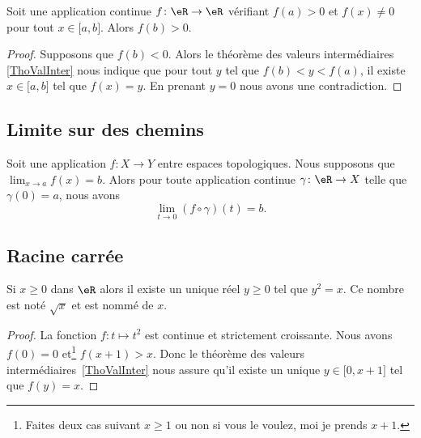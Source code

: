 \begin{corollary}	\label{CORooQXHDooWjSiKm}
	Soit une application continue \(f \colon \eR\to \eR  \) vérifiant \( f(a)>0\) et \( f(x)\neq 0\) pour tout \( x\in \mathopen[ a,b\mathclose]\). Alors \( f(b)>0\).
\end{corollary}

\begin{proof}
	Supposons que \( f(b)<0\). Alors le théorème des valeurs intermédiaires \ref{ThoValInter} nous indique que pour tout \( y\) tel que \( f(b)<y<f(a)\), il existe \( x\in \mathopen[ a,b\mathclose]\) tel que \( f(x)=y\). En prenant \( y=0\) nous avons une contradiction.
\end{proof}

\subsection{Limite sur des chemins}

\begin{proposition}		\label{PROPooREUUooUNDFRi}
	Soit une application \(f \colon X\to Y  \) entre espaces topologiques. Nous supposons que \( \lim_{x\to a}f(x)=b\). Alors pour toute application continue \(\gamma \colon \eR\to X  \) telle que \( \gamma(0)=a\), nous avons
	\begin{equation}
		\lim_{t\to 0}(f\circ\gamma)(t)=b.
	\end{equation}
\end{proposition}

\subsection{Racine carrée}


\begin{corollaryDef}     \label{DEFooGQTYooORuvQb}
	Si \( x\geq 0\) dans \( \eR\) alors il existe un unique réel \( y\geq 0\) tel que \( y^2=x\). Ce nombre est noté \( \sqrt{x}\) et est nommé  de \( x\).
\end{corollaryDef}

\begin{proof}
	La fonction \( f\colon t\mapsto t^2\) est continue et strictement croissante. Nous avons \( f(0)=0\) et\footnote{Faites deux cas suivant \( x\geq 1\) ou non si vous le voulez, moi je prends \( x+1\).} \( f(x+1)>x\). Donc le théorème des valeurs intermédiaires~\ref{ThoValInter} nous assure qu'il existe un unique \( y\in\mathopen[ 0 , x+1 \mathclose]\) tel que \( f(y)=x\).
\end{proof}

